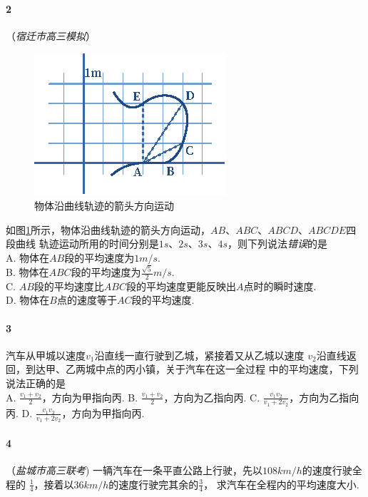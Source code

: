 				\paragraph{2}（\emph{宿迁市高三模拟}）
					\begin{figure}
						\begin{center}
							\includegraphics[scale=2]{PIC/004.eps}
							\caption{物体沿曲线轨迹的箭头方向运动}
							\label{Pic::物体沿曲线轨迹的箭头方向运动}
						\end{center}
					\end{figure}
					如图\ref{Pic::物体沿曲线轨迹的箭头方向运动}所示，物体沿曲线轨迹的箭头方向运动，$AB$、$ABC$、$ABCD$、$ABCDE$四段曲线%
					轨迹运动所用的时间分别是$1s$、$2s$、$3s$、$4s$，则下列说法\emph{错误}的是%
					\mathc\\
					A. 物体在$AB$段的平均速度为$1m/s$.\\
					B. 物体在$ABC$段的平均速度为$\frac{\sqrt{5}}{2}m/s$.\\
					C. $AB$段的平均速度比$ABC$段的平均速度更能反映出$A$点时的瞬时速度.\\
					D. 物体在$B$点的速度等于$AC$段的平均速度.\\
				\paragraph{3}
							汽车从甲城以速度$v_1$沿直线一直行驶到乙城，紧接着又从乙城以速度%
							$v_2$沿直线返回，到达甲、乙两城中点的丙小镇，关于汽车在这一全过程%
							中的平均速度，下列说法正确的是\mathc\\
							A. $\frac{v_1+v_2}{2}$，方向为甲指向丙.
							B. $\frac{v_1+v_2}{2}$，方向为乙指向丙.
							C. $\frac{v_1v_2}{v_1+2v_2}$，方向为乙指向丙.
							D. $\frac{v_1v_2}{v_1+2v_2}$，方向为甲指向丙.
				\paragraph{4}（\emph{盐城市高三联考})
					一辆汽车在一条平直公路上行驶，先以$108km/h$的速度行驶全程的%
					$\frac{1}{4}$，接着以$36km/h$的速度行驶完其余的$\frac{3}{4}$，%
					求汽车在全程内的平均速度大小.


